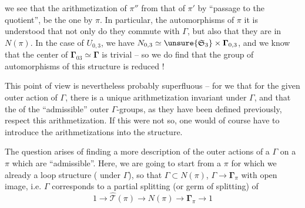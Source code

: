 
we see that the arithmetization of $\pi''$  from that of $\pi'$ by ``passage to the quotient'', be the one  by $\pi$.  In particular,  the automorphisms of $\pi$ it is understood that  not only do they commute with $\Gamma$, but also that they are in $N(\pi)$.  In the case of $U_{0,3}$, we have $N_{0,3}\simeq\unsure{\mathfrak S_3}\times\boldsymbol{\Gamma}_{0,3}$, and we know that the center of $\boldsymbol{\Gamma}_{03}\simeq\boldsymbol{\Gamma}$ is trivial -- so we do find that the group of automorphisms of this structure is reduced  !

This point of view is nevertheless probably superfluous -- for we  that for the given outer action of $\Gamma$, there is a unique arithmetization invariant under $\Gamma$, and that the   of the ``admissible'' outer $\Gamma$-groups, as they have been defined previously,  respect this arithmetization. If this were not so, one would of course have to introduce the arithmetizations into the structure.




The question arises of finding a more   description of the outer actions of a $\Gamma$ on a $\pi$ which are ``admissible''.  Here, we are going to start from a $\pi$ for which we already  a loop structure  ( under $\Gamma$), so  that $\Gamma\subset N(\pi)$, $\Gamma\longrightarrow\boldsymbol{\Gamma}_\pi$  with open image,  i.e. $\Gamma$ corresponds to a partial splitting (or germ of splitting) of 
\[
1\longrightarrow\widehat{\mathcal T}(\pi)\longrightarrow N(\pi)\longrightarrow\boldsymbol{\Gamma}_\pi\longrightarrow1
\]

